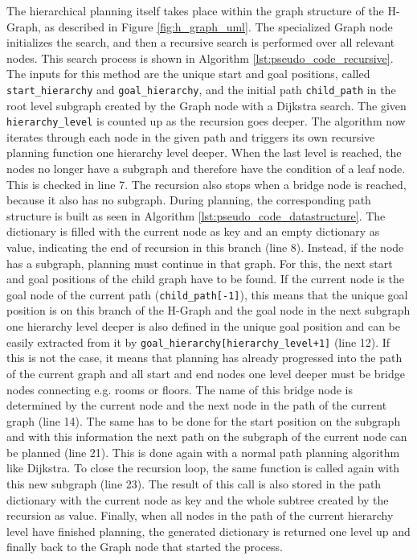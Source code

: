 The hierarchical planning itself takes place within the graph structure of the H-Graph, as described in Figure \ref{fig:h_graph_uml}. The specialized Graph node initializes the search, and then a recursive search is performed over all relevant nodes. This search process is shown in Algorithm \ref{lst:pseudo_code_recursive}. The inputs for this method are the unique start and goal positions, called \texttt{start\_hierarchy} and \texttt{goal\_hierarchy}, and the initial path \texttt{child\_path} in the root level subgraph created by the Graph node with a Dijkstra search. The given \texttt{hierarchy\_level} is counted up as the recursion goes deeper. The algorithm now iterates through each node in the given path and triggers its own recursive planning function one hierarchy level deeper. When the last level is reached, the nodes no longer have a subgraph and therefore have the condition of a leaf node. This is checked in line 7. The recursion also stops when a bridge node is reached, because it also has no subgraph. During planning, the corresponding path structure is built as seen in Algorithm \ref{lst:pseudo_code_datastructure}. The dictionary is filled with the current node as key and an empty dictionary as value, indicating the end of recursion in this branch (line 8). Instead, if the node has a subgraph, planning must continue in that graph. For this, the next start and goal positions of the child graph have to be found. If the current node is the goal node of the current path (\texttt{child\_path[-1]}), this means that the unique goal position is on this branch of the H-Graph and the goal node in the next subgraph one hierarchy level deeper is also defined in the unique goal position and can be easily extracted from it by \texttt{goal\_hierarchy[hierarchy\_level+1]} (line 12). If this is not the case, it means that planning has already progressed into the path of the current graph and all start and end nodes one level deeper must be bridge nodes connecting e.g. rooms or floors. The name of this bridge node is determined by the current node and the next node in the path of the current graph (line 14). The same has to be done for the start position on the subgraph and with this information the next path on the subgraph of the current node can be planned (line 21). This is done again with a normal path planning algorithm like Dijkstra. To close the recursion loop, the same function is called again with this new subgraph (line 23). The result of this call is also stored in the path dictionary with the current node as key and the whole subtree created by the recursion as value. Finally, when all nodes in the path of the current hierarchy level have finished planning, the generated dictionary is returned one level up and finally back to the Graph node that started the process.

